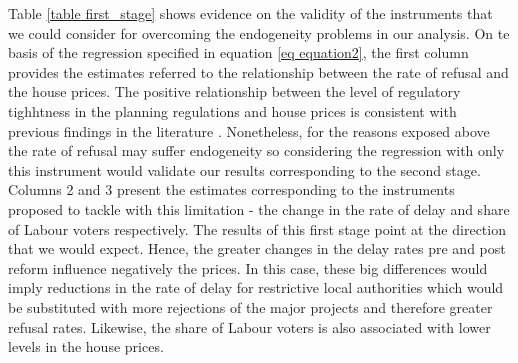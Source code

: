 \documentclass[12pt,letterpaper]{article}
\begin{document}
Table \ref{table first_stage} shows evidence on the validity of the instruments that we could consider for overcoming 
the endogeneity problems in our analysis. On te basis of the regression
specified in equation \ref{eq equation2}, the first column
provides the estimates referred to the relationship between the rate of refusal and the 
house prices.  The positive relationship between the level of regulatory tighhtness in the planning 
regulations and house prices is consistent with previous findings in the literature . Nonetheless, for the reasons exposed above the 
rate of refusal may suffer endogeneity so considering the regression with only this instrument would validate our results corresponding
to the second stage. Columns 2 and 3 present the estimates 
corresponding to the instruments proposed to tackle with this limitation - the 
change in the rate of delay and share of Labour voters respectively. The results of this first stage 
point at the direction that we would expect. Hence, the greater changes in the delay rates pre and
 post reform influence negatively the prices. In this case, these big differences would imply reductions in the rate of delay for restrictive
  local authorities which would be substituted with more rejections of the major projects and therefore 
  greater refusal rates. Likewise, the share of Labour voters is also associated with lower levels in the house prices. 
  
\end{document}
